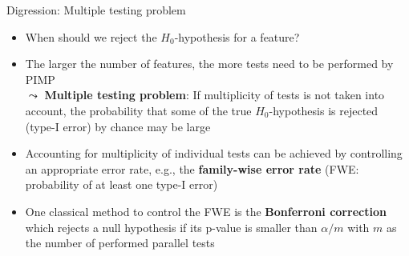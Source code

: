 \documentclass[11pt,compress,t,notes=noshow, aspectratio=169, xcolor=table]{beamer}
\begin{document}
\begin{frame}{Digression: Multiple testing problem }
\begin{itemize}[<+->]
  \item When should we reject the $H_0$-hypothesis for a feature? 
  \item The larger the number of features, the more tests need to be performed by PIMP\\
  $\leadsto$ \textbf{Multiple testing problem}: If multiplicity of tests is not taken into account, the probability that some of the true $H_0$-hypothesis is rejected (type-I error) by chance may be large
  \item Accounting for multiplicity of individual tests can be achieved by controlling an appropriate error rate, e.g., the \textbf{family-wise error rate} (FWE: probability of at least one type-I error)
  \item One classical method to control the FWE is the \textbf{Bonferroni correction} which rejects a null hypothesis if its p-value is smaller than $\alpha/m$ with $m$ as the number of performed parallel tests
  \end{itemize} 

\end{frame}

\endlecture
\end{document}
